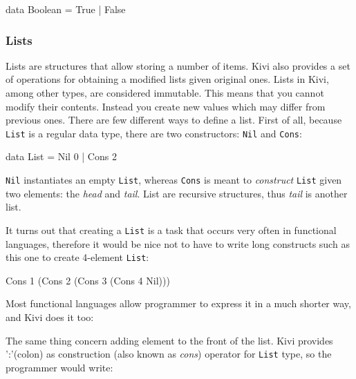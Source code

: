 \documentclass[12pt,a4paper]{report}
\begin{document}
\vspace*{0.2in}
\begin{code}[style=haskell]
  data Boolean = True | False
\end{code}

\subsubsection{Lists}
Lists are structures that allow storing a number of items. Kivi also provides a
set of operations for obtaining a modified lists given original ones. Lists in
Kivi, among other types, are considered immutable. This means that you cannot
modify their contents. Instead you create new values which may differ from
previous ones. There are few different ways to define a list. First of all,
because \texttt{List} is a regular data type, there are two constructors:
\texttt{Nil} and \texttt{Cons}:

\vspace*{0.2in}
\begin{code}[style=haskell]
  data List = Nil 0 | Cons 2
\end{code}

\texttt{Nil} instantiates an empty \texttt{List}, whereas \texttt{Cons} is
meant to \textit{construct} \texttt{List} given two elements: the \textit{head}
and \textit{tail}. List are recursive structures, thus \textit{tail} is another
list.

It turns out that creating a \texttt{List} is a task that occurs very often in
functional languages, therefore it would be nice not to have to write long
constructs such as this one to create 4-element \texttt{List}:

\vspace*{0.2in}
\begin{code}[style=haskell]
  Cons 1 (Cons 2 (Cons 3 (Cons 4 Nil)))
\end{code}

Most functional languages allow programmer to express it in a much shorter way,
and Kivi does it too:

\vspace*{0.2in}
\begin{code}[style=haskell]
  [1, 2, 3, 4]
\end{code}

The same thing concern adding element to the front of the list. Kivi provides
':'(colon) as construction (also known as \textit{cons}) operator for
\texttt{List} type, so the programmer would write:
\end{document}
